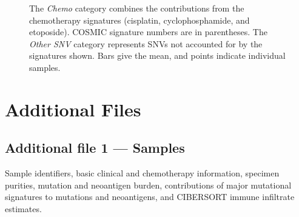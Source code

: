 \documentclass[linenumbers]{bmcart}
\begin{document}
\begin{backmatter}
\begin{figure}[h!]
  \caption{
      The \textit{Chemo} category combines the contributions from the chemotherapy signatures (cisplatin, cyclophosphamide, and etoposide). COSMIC signature numbers are in parentheses. The \textit{Other SNV} category represents SNVs not accounted for by the signatures shown. Bars give the mean, and points indicate individual samples.}
      \end{figure}




\section*{Additional Files}
  \subsection*{Additional file 1 --- Samples}
    Sample identifiers, basic clinical and chemotherapy information, specimen purities, mutation and neoantigen burden, contributions of major mutational signatures to mutations and neoantigens, and CIBERSORT immune infiltrate estimates.


\end{backmatter}
\end{document}
